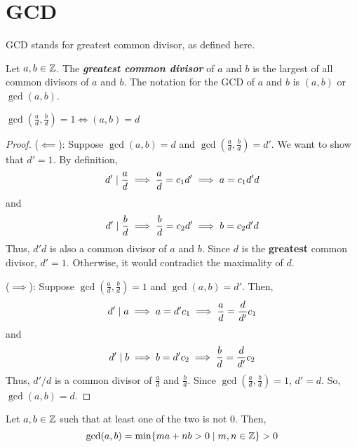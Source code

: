 \section{GCD}

GCD stands for greatest common divisor, as defined here.

\begin{definition}
    Let $a,b \in \mathbb{Z}$. The \textit{\textbf{greatest common divisor}} of $a$ and $b$ is the largest of all common divisors of $a$ and $b$. The notation for the GCD of $a$ and $b$ is $(a,b)$ or $\gcd(a,b)$.
\end{definition}

\begin{proposition}
    $\gcd(\frac{a}{d}, \frac{b}{d}) = 1 \iff (a,b) = d$ 
\end{proposition}

\begin{proof}
    \hfill

    ($\impliedby$): Suppose $\gcd(a,b) = d$ and $\gcd(\frac{a}{d}, \frac{b}{d}) = d'$. We want to show that $d' = 1$. By definition,
    $$
    d' \mathrel{\mid} \frac{a}{d} \implies \frac{a}{d} = c_1 d' \implies a = c_1d'd
    $$
    and
    $$
    d' \mathrel{\mid} \frac{b}{d} \implies \frac{b}{d} = c_2 d' \implies b = c_2d'd
    $$
    Thus, $d'd$ is also a common divisor of $a$ and $b$. Since $d$ is the \textbf{greatest} common divisor, $d' = 1$. Otherwise, it would contradict the maximality of $d$.

    ($\implies$): Suppose $\gcd(\frac{a}{d},\frac{b}{d}) = 1$ and $\gcd(a,b) = d'$. Then,
    $$
    d' \mathrel{\mid} a \implies a = d' c_1 \implies \frac{a}{d} = \frac{d}{d'} c_1
    $$
    and
    $$
    d' \mathrel{\mid} b \implies b = d' c_2 \implies \frac{b}{d} = \frac{d}{d'} c_2
    $$
    Thus, $d'/d$ is a common divisor of $\frac{a}{d}$ and $\frac{b}{d}$. Since $\gcd(\frac{a}{d}, \frac{b}{d}) = 1$, $d' = d$. So, $\gcd(a,b) = d$.
\end{proof}

\begin{proposition} \label{prop:gcd-linear-combination}
    Let $a,b \in \mathbb{Z}$ such that at least one of the two is not 0. Then,
    $$
    \gcd(a,b) = \min\{ma+nb > 0 \mid m,n \in \mathbb{Z}\} > 0
    $$
\end{proposition}

